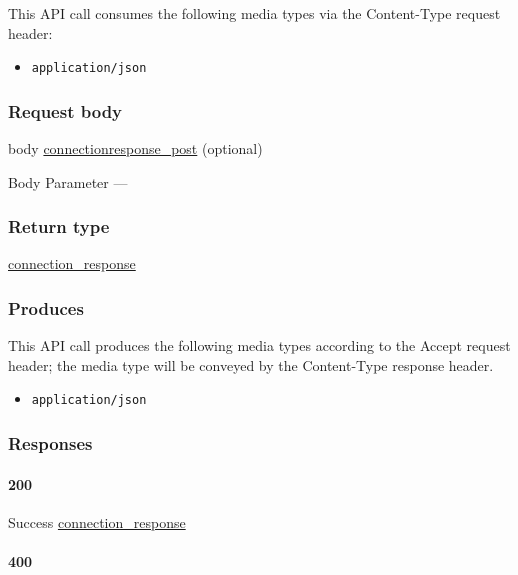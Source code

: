 This API call consumes the following media types via the {Content-Type}
request header:

\begin{itemize}
\tightlist
\item
  \texttt{application/json}
\end{itemize}

\hypertarget{request-body-51}{%
\subsubsection{Request body}\label{request-body-51}}

body
\protect\hyperlink{connectionresponse_post}{connectionresponse\_post}
(optional)

{Body Parameter} ---

\hypertarget{return-type-124}{%
\subsubsection{Return type}\label{return-type-124}}

\protect\hyperlink{connection_response}{connection\_response}

\hypertarget{produces-158}{%
\subsubsection{Produces}\label{produces-158}}

This API call produces the following media types according to the
{Accept} request header; the media type will be conveyed by the
{Content-Type} response header.

\begin{itemize}
\tightlist
\item
  \texttt{application/json}
\end{itemize}

\hypertarget{responses-163}{%
\subsubsection{Responses}\label{responses-163}}

\hypertarget{section-525}{%
\paragraph{200}\label{section-525}}

Success \protect\hyperlink{connection_response}{connection\_response}

\hypertarget{section-526}{%
\paragraph{400}\label{section-526}}

